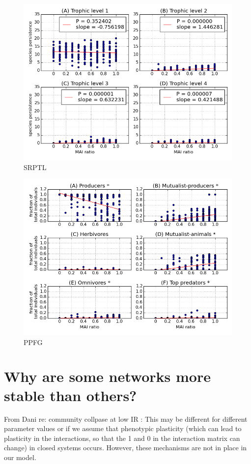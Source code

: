 \begin{figure}
	\centering
	\includegraphics[width=1.0\linewidth]{"figures/species_richness_per_trophic_level"}
	\caption{SRPTL}
	\label{fig:mvp_species_per_tl}
\end{figure}

\begin{figure}
	\centering
	\includegraphics[width=1.0\linewidth]{"figures/proportion_per_functional_group"}
	\caption{PPFG}
	\label{fig:mvp_prop_per_fg}
\end{figure}

\section{Why are some networks more stable than others?}



From Dani re: community collpase at low IR : This may be different for different parameter values or if we assume that phenotypic plasticity (which can lead to plasticity in the interactions, so that the 1 and 0 in the interaction matrix can change) in closed systems occurs. However, these mechanisms are not in place in our model.